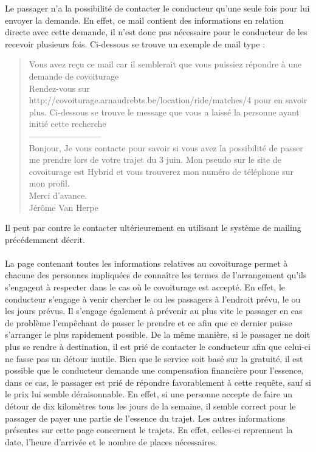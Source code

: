 \documentclass[12pt, a4paper, oneside]{article}
\begin{document}
     Le passager n'a la possibilité de contacter le conducteur qu'une seule fois pour lui envoyer la demande. En effet, ce mail contient des informations en relation directe avec cette demande, il n'est donc pas nécessaire pour le conducteur de les recevoir plusieurs fois. Ci-dessous se trouve un exemple de mail type :
     \begin{quote}\label{mail-exemple}
         Vous avez reçu ce mail car il semblerait que vous puissiez répondre à une demande de covoiturage\\
         Rendez-vous sur http://covoiturage.arnaudrebts.be/location/ride/matches/4 pour en savoir plus.
          Ci-dessous se trouve le message que vous a laissé la personne ayant initié cette recherche\\
          --------------------------\\
            Bonjour,
            Je vous contacte pour savoir si vous avez la possibilité de passer me prendre lors de votre trajet du 3 juin.
            Mon pseudo sur le site de covoiturage est Hybrid et vous trouverez mon numéro de téléphone sur mon profil.\\
            
            Merci d'avance.\\
            Jérôme Van Herpe
        \end{quote}
        Il peut par contre le contacter ultérieurement en utilisant le système de mailing précédemment décrit.\\\\
        \indent La page contenant toutes les informations relatives au covoiturage permet à chacune des personnes impliquées de connaître les termes de l'arrangement qu'ils s'engagent à respecter dans le cas où le covoiturage est accepté. En effet, le conducteur s'engage à venir chercher le ou les passagers à l'endroit prévu, le ou les jours prévus. Il s'engage également à prévenir au plus vite le passager en cas de problème l'empêchant de passer le prendre et ce afin que ce dernier puisse s'arranger le plus rapidement possible. De la même manière, si le passager ne doit plus se rendre à destination, il est prié de contacter le conducteur afin que celui-ci ne fasse pas un détour inutile. Bien que le service soit basé sur la gratuité, il est possible que le conducteur demande une compensation financière pour l'essence, dans ce cas, le passager est prié de répondre favorablement à cette requête, sauf si le prix lui semble déraisonnable. En effet, si une personne accepte de faire un détour de dix kilomètres tous les jours de la semaine, il semble correct pour le passager de payer une partie de l'essence du trajet. Les autres informations présentes sur cette page concernent le trajets. En effet, celles-ci reprennent la date, l'heure d'arrivée et le nombre de places nécessaires. \\
\end{document}
